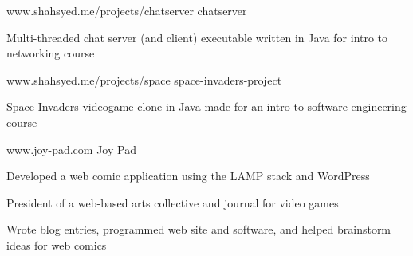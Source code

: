 \begin{cventries}
  \cventry
    {www.shahsyed.me/projects/chatserver}
    {chatserver}
    { }
    { }
    {
      \begin{cvitems}
        \item {Multi-threaded chat server (and client) executable written in Java for intro to networking course}
      \end{cvitems}
    }
    \cventry
    {www.shahsyed.me/projects/space}
    {space-invaders-project}
    { }
    { }
    {
      \begin{cvitems}
        \item {Space Invaders videogame clone in Java made for an intro to software engineering course}
      \end{cvitems}
    }
   \cventry
    {www.joy-pad.com}
    {Joy Pad}
    { }
    { }
    {
      \begin{cvitems}
        \item {Developed a web comic application using the LAMP stack and WordPress}
        \item {President of a web-based arts collective and journal for video games}		
        \item {Wrote blog entries, programmed web site and software, and helped brainstorm ideas for web comics}		
      \end{cvitems}
    }
\end{cventries}
